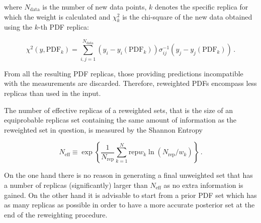 where $N_{\mathrm{data}}$ is the number of new data points, $k$ denotes the specific replica for which the weight is calculated and $\chi^2_k$ is the chi-square of the new data obtained using the $k$-th PDF replica:

{\small
\begin{equation}
 \chi^2 (y,\mathrm{PDF}_k) = \sum_{i,j=1}^{N_{\mathrm{data}}} (y_i - y_i(\mathrm{PDF}_k)) \sigma^{-1}_{ij} (y_j-y_j(\mathrm{PDF}_k))\,. 
\end{equation}
}

%
From all the resulting PDF replicas, those providing predictions incompatible with the measurements are discarded. 
Therefore, reweighted PDFs encompass less replicas than used in the input.

The number of effective replicas of a reweighted sets, that is the size of an equiprobable replicas set 
containing the same amount of information as the reweighted set in question, is measured by the Shannon
Entropy

\begin{equation}
\label{eq:shannon}
N_\mathrm{eff}\equiv 
\exp\left\{\frac{1}{N_\mathrm{rep}}\sum_{k=1}^N\mathrm{rep}w_k\ln(N_\mathrm{rep}/w_k)\right\}\,.
\end{equation}

On the one hand there is no reason in generating a final unweighted set that has a number of replicas
(significantly) larger than $N_\mathrm{eff}$ as no extra information is gained. On the other hand it is
advisable to start from a prior PDF set which has as many replicas as possible in order to have a more
accurate posterior set at the end of the reweighting procedure.






